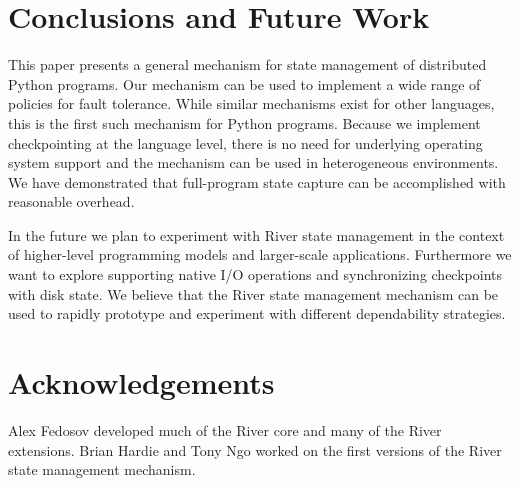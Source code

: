 \section{Conclusions and Future Work}
\label{sec:Conclusions}

This paper presents a general mechanism for state management of distributed Python programs.  Our mechanism can be used to implement a wide range of policies for fault tolerance.  While similar mechanisms exist for other languages, this is the first such mechanism for Python programs. 
Because we implement checkpointing at the language level, there is no need for underlying operating system support and the mechanism can be used in heterogeneous environments.  We have demonstrated that full-program state capture can be accomplished with reasonable overhead.

In the future we plan to experiment with River state management in the context of higher-level programming models and larger-scale applications.  Furthermore we want to explore supporting native I/O operations and synchronizing checkpoints with disk state.  We believe that the River state management mechanism can be used to rapidly prototype and experiment with different dependability strategies.

\section*{Acknowledgements}

Alex Fedosov developed much of the River core and many of the River
extensions.  Brian Hardie and Tony Ngo worked on the first versions of
the River state management mechanism.
